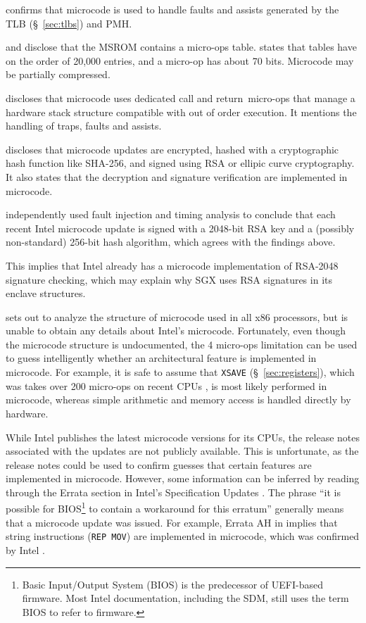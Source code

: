 \cite{intel1996dtlb} confirms that microcode is used to handle faults and
assists generated by the TLB (\S~\ref{sec:tlbs}) and PMH.

\cite{intel2008genetic} and \cite{intel2012clusters} disclose that the MSROM
contains a micro-ops table. \cite{intel2012clusters} states that tables have on
the order of 20,000 entries, and a micro-op has about 70 bits. Microcode may be
partially compressed.

\cite{intel2007microstack} discloses that microcode uses dedicated call and
return micro-ops that manage a hardware stack structure compatible with out of
order execution. It mentions the handling of traps, faults and assists.

\cite{intel2012patching} discloses that microcode updates are encrypted, hashed
with a cryptographic hash function like SHA-256, and signed using RSA or
ellipic curve cryptography. It also states that the decryption and signature
verification are implemented in microcode.

\cite{hawkes2012microcode} independently used fault injection and timing
analysis to conclude that each recent Intel microcode update is signed with a
2048-bit RSA key and a (possibly non-standard) 256-bit hash algorithm, which
agrees with the findings above.

This
implies that Intel already has a microcode implementation of RSA-2048 signature
checking, which may explain why SGX uses RSA signatures in its enclave
structures.

\cite{chen2014microcode} sets out to analyze the structure of microcode used in
all x86 processors, but is unable to obtain any details about Intel's
microcode. Fortunately, even though the microcode structure is undocumented,
the 4 micro-ops limitation can be used to guess intelligently whether an
architectural feature is implemented in microcode. For example, it is safe to
assume that \texttt{XSAVE} (\S~\ref{sec:registers}), which was takes over 200
micro-ops on recent CPUs \cite{fog2014microops}, is most likely performed in
microcode, whereas simple arithmetic and memory access is handled directly by
hardware.

While Intel publishes the latest microcode versions for its CPUs, the release
notes associated with the updates are not publicly available. This is
unfortunate, as the release notes could be used to confirm guesses that certain
features are implemented in microcode. However, some information can be
inferred by reading through the Errata section in Intel's Specification Updates
\cite{intel2010errata, intel2015errata, intel2015errata2}. The phrase ``it is
possible for BIOS\footnote{Basic Input/Output System (BIOS)
is the predecessor of UEFI-based firmware. Most Intel documentation, including
the SDM, still uses the term BIOS to refer to firmware.} to contain a
workaround for this erratum'' generally means that a microcode update was
issued. For example, Errata AH in \cite{intel2010errata} implies that string
instructions (\texttt{REP MOV}) are implemented in microcode, which was
confirmed by Intel \cite{abraham2006repmov}.

